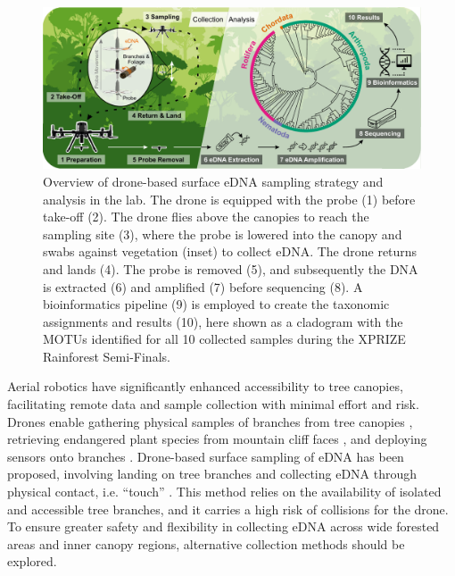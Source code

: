 \begin{figure}[tb]
    \centering
    \includegraphics[width=\linewidth]{figures/01_overview.pdf}
    
    \caption{Overview of drone-based surface \gls{eDNA} sampling strategy and analysis in the lab. The drone is equipped with the probe (1) before take-off (2). The drone flies above the canopies to reach the sampling site (3), where the probe is lowered into the canopy and swabs against vegetation (inset) to collect \gls{eDNA}. The drone returns and lands (4). The probe is removed (5), and subsequently the DNA is extracted (6) and amplified (7) before sequencing (8). A bioinformatics pipeline (9) is employed to create the taxonomic assignments and results (10), here shown as a cladogram with the \glspl{MOTU} identified for all 10 collected samples during the XPRIZE Rainforest Semi-Finals.}
    \label{fig:1-intro}
\end{figure}

Aerial robotics have significantly enhanced accessibility to tree canopies, facilitating remote data and sample collection with minimal effort and risk. Drones enable gathering physical samples of branches from tree canopies \cite{Charron2020}, retrieving endangered plant species from mountain cliff faces \cite{lavigne-2022}, and deploying sensors onto branches \cite{Geckeler2022, hamaza-2020}. Drone-based surface sampling of \gls{eDNA} has been proposed, involving landing on tree branches and collecting \gls{eDNA} through physical contact, i.e. “touch” \cite{eDrone}. This method relies on the availability of isolated and accessible tree branches, and it carries a high risk of collisions for the drone. To ensure greater safety and flexibility in collecting \gls{eDNA} across wide forested areas and inner canopy regions, alternative collection methods should be explored.


